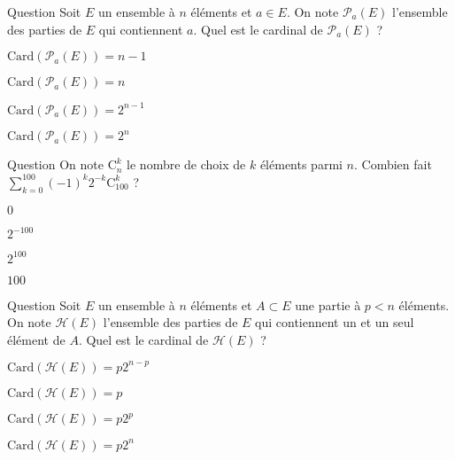 \begin{multi}[multiple,feedback=
{Les éléments de \(\mathcal{P}_a(E)\) sont de la forme \(\{a\}\cup A\) où \(A\subset E\setminus \{a\}\). Donc \(\mathrm{Card}(\mathcal{P}_a(E))=\mathrm{Card}(\mathcal{P}(E\setminus \{a\}))=2^{n-1}\).
}]{Question}
Soit \(E\) un ensemble à \(n\) éléments et \(a\in E\). On note \(\mathcal{P}_a(E)\) l'ensemble des parties de \(E\) qui contiennent \(a\). Quel est le cardinal de \(\mathcal{P}_a(E)\) ?

    \item \(\mathrm{Card}(\mathcal{P}_a(E))=n-1\)
    \item \(\mathrm{Card}(\mathcal{P}_a(E))=n\)
    \item* \(\mathrm{Card}(\mathcal{P}_a(E))=2^{n-1}\)
    \item \(\mathrm{Card}(\mathcal{P}_a(E))=2^n\)
\end{multi}


\begin{multi}[multiple,feedback=
{Utiliser le binôme de Newton, \(\displaystyle \sum _{k=0}^{100}\mathrm{C}^k_{100}\left(-\frac{1}{2}\right)^k=\left(1-\frac{1}{2}\right)^{100}=\frac{1}{2^{100}}\).
}]{Question}
On note \(\mathrm{C}^k_n\) le nombre de choix de \(k\) éléments parmi \(n\). Combien fait \(\displaystyle \sum _{k=0}^{100}(-1)^k2^{-k}\mathrm{C}^k_{100}\) ?

    \item \(0\)
    \item* \(2^{-100}\)
    \item \(2^{100}\)
    \item \(100\)
\end{multi}


\begin{multi}[multiple,feedback=
{Si \(A=\{a_1,\dots ,a_p\}\), les éléments de \(\mathcal{H}(E)\) sont de la forme \(\{a_i\}\cup B\), où \(a_i\in A\) et \(B\subset E\setminus A\). Donc \(\mathrm{Card}(\mathcal{H}(E))=\mathrm{Card}(A)\times \mathrm{Card}(\mathcal{P}(E\setminus A))=p2^{n-p}\).
}]{Question}
Soit \(E\) un ensemble à \(n\) éléments et \(A\subset E\) une partie à \(p < n\) éléments. On note \(\mathcal{H}(E)\) l'ensemble des parties de \(E\) qui contiennent un et un seul élément de \(A\). Quel est le cardinal de \(\mathcal{H}(E)\) ?

    \item* \(\mathrm{Card}(\mathcal{H}(E))=p2^{n-p}\)
    \item \(\mathrm{Card}(\mathcal{H}(E))=p\)
    \item \(\mathrm{Card}(\mathcal{H}(E))=p2^p\)
    \item \(\mathrm{Card}(\mathcal{H}(E))=p2^n\)
\end{multi}


